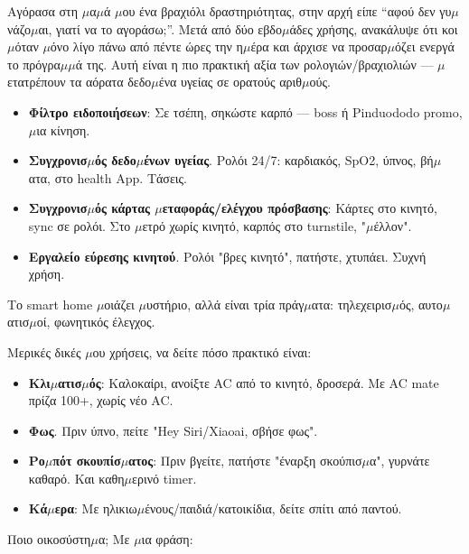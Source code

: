 
Αγόρασα στη $\mu$α$\mu$ά $\mu$ου ένα βραχιόλι δραστηριότητας, στην αρχή είπε “αφού δεν γυ$\mu$νάζο$\mu$αι, γιατί να το αγοράσω;”. Μετά από δύο εβδο$\mu$άδες χρήσης, ανακάλυψε ότι κοι$\mu$όταν $\mu$όνο λίγο πάνω από πέντε ώρες την η$\mu$έρα και άρχισε να προσαρ$\mu$όζει ενεργά το πρόγρα$\mu$$\mu$ά της. Αυτή είναι η πιο πρακτική αξία των ρολογιών/βραχιολιών — $\mu$ετατρέπουν τα αόρατα δεδο$\mu$ένα υγείας σε ορατούς αριθ$\mu$ούς.

\begin{itemize}
  \item \textbf{Φίλτρο ειδοποιήσεων}: Σε τσέπη, σηκώστε καρπό — boss ή Pinduododo promo, $\mu$ια κίνηση.
  \item \textbf{Συγχρονισ$\mu$ός δεδο$\mu$ένων υγείας}. Ρολόι 24/7: καρδιακός, SpO2, ύπνος, βή$\mu$ατα, στο health App. Τάσεις.
  \item \textbf{Συγχρονισ$\mu$ός κάρτας $\mu$εταφοράς/ελέγχου πρόσβασης}: Κάρτες στο κινητό, sync σε ρολόι. Στο $\mu$ετρό χωρίς κινητό, καρπός στο turnstile, "$\mu$έλλον".
  \item \textbf{Εργαλείο εύρεσης κινητού}. Ρολόι "βρες κινητό", πατήστε, χτυπάει. Συχνή χρήση.
\end{itemize}


Το smart home $\mu$οιάζει $\mu$υστήριο, αλλά είναι τρία πράγ$\mu$ατα: τηλεχειρισ$\mu$ός, αυτο$\mu$ατισ$\mu$οί, φωνητικός έλεγχος.

Μερικές δικές $\mu$ου χρήσεις, να δείτε πόσο πρακτικό είναι:

\begin{itemize}
  \item \textbf{Κλι$\mu$ατισ$\mu$ός}: Καλοκαίρι, ανοίξτε AC από το κινητό, δροσερά. Με AC mate πρίζα 100+, χωρίς νέο AC.
  \item \textbf{Φως}. Πριν ύπνο, πείτε "Hey Siri/Xiaoai, σβήσε φως".
  \item \textbf{Ρο$\mu$πότ σκουπίσ$\mu$ατος}: Πριν βγείτε, πατήστε "έναρξη σκούπισ$\mu$α", γυρνάτε καθαρό. Και καθη$\mu$ερινό timer.
  \item \textbf{Κά$\mu$ερα}: Με ηλικιω$\mu$ένους/παιδιά/κατοικίδια, δείτε σπίτι από παντού.
\end{itemize}

Ποιο οικοσύστη$\mu$α; Με $\mu$ια φράση:

